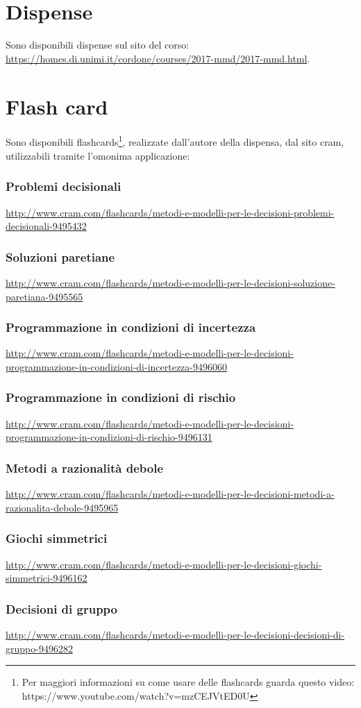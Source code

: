 \documentclass[\main/main.tex]{subfiles}
\begin{document}
\section{Dispense}
Sono disponibili dispense sul sito del corso: \url{https://homes.di.unimi.it/cordone/courses/2017-mmd/2017-mmd.html}.

\section{Flash card}
Sono disponibili flashcards\footnote{Per maggiori informazioni su come usare delle flashcards guarda questo video: https://www.youtube.com/watch?v=mzCEJVtED0U}, realizzate dall'autore della dispensa, dal sito cram, utilizzabili tramite l'omonima applicazione:

\subsubsection*{Problemi decisionali}
\url{http://www.cram.com/flashcards/metodi-e-modelli-per-le-decisioni-problemi-decisionali-9495432}
\subsubsection*{Soluzioni paretiane}
\url{http://www.cram.com/flashcards/metodi-e-modelli-per-le-decisioni-soluzione-paretiana-9495565}
\subsubsection*{Programmazione in condizioni di incertezza}
\url{http://www.cram.com/flashcards/metodi-e-modelli-per-le-decisioni-programmazione-in-condizioni-di-incertezza-9496060}
\subsubsection*{Programmazione in condizioni di rischio}
\url{http://www.cram.com/flashcards/metodi-e-modelli-per-le-decisioni-programmazione-in-condizioni-di-rischio-9496131}
\subsubsection*{Metodi a razionalità debole}
\url{http://www.cram.com/flashcards/metodi-e-modelli-per-le-decisioni-metodi-a-razionalita-debole-9495965}
\subsubsection*{Giochi simmetrici}
\url{http://www.cram.com/flashcards/metodi-e-modelli-per-le-decisioni-giochi-simmetrici-9496162}
\subsubsection*{Decisioni di gruppo}
\url{http://www.cram.com/flashcards/metodi-e-modelli-per-le-decisioni-decisioni-di-gruppo-9496282}
\end{document}
